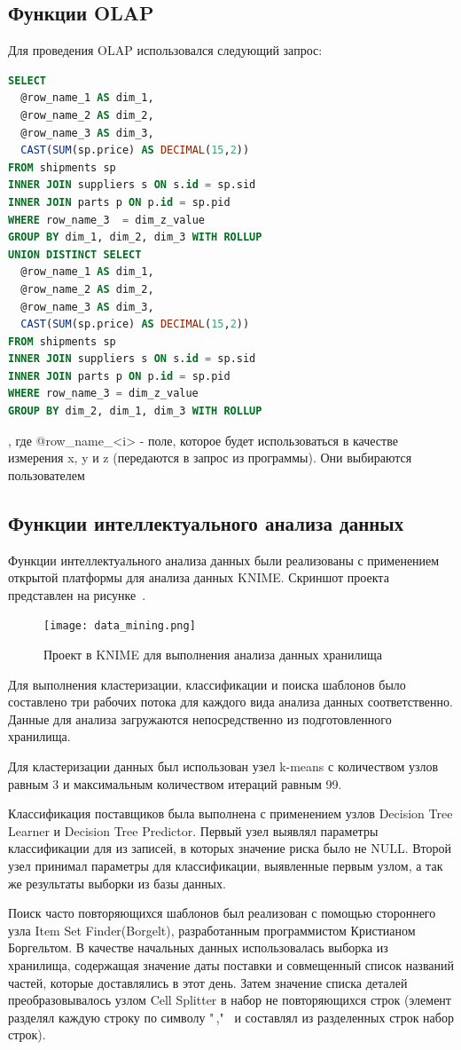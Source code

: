\subsection{Функции OLAP}
Для проведения OLAP использовался следующий запрос:
\begin{lstlisting}[language=SQL]
SELECT 
  @row_name_1 AS dim_1, 
  @row_name_2 AS dim_2, 
  @row_name_3 AS dim_3, 
  CAST(SUM(sp.price) AS DECIMAL(15,2)) 
FROM shipments sp 
INNER JOIN suppliers s ON s.id = sp.sid 
INNER JOIN parts p ON p.id = sp.pid 
WHERE row_name_3  = dim_z_value 
GROUP BY dim_1, dim_2, dim_3 WITH ROLLUP 
UNION DISTINCT SELECT 
  @row_name_1 AS dim_1, 
  @row_name_2 AS dim_2, 
  @row_name_3 AS dim_3, 
  CAST(SUM(sp.price) AS DECIMAL(15,2)) 
FROM shipments sp 
INNER JOIN suppliers s ON s.id = sp.sid 
INNER JOIN parts p ON p.id = sp.pid 
WHERE row_name_3 = dim_z_value  
GROUP BY dim_2, dim_1, dim_3 WITH ROLLUP
\end{lstlisting},
где @row\_name\_<i> - поле, которое будет использоваться в качестве измерения x, y и z (передаются в запрос из программы). Они выбираются пользователем 

\subsection{Функции интеллектуального анализа данных}
Функции интеллектуального анализа данных были реализованы с применением открытой платформы для анализа данных KNIME. Скриншот проекта представлен на рисунке~.\par
\begin{figure}[h]
  \centering
  \texttt{[image: data\_mining.png]}
  \caption{Проект в KNIME для выполнения анализа данных хранилища}
  \label{data-mining}
\end{figure}
Для выполнения кластеризации, классификации и поиска шаблонов было составлено три рабочих потока для каждого вида анализа данных соответственно. Данные для анализа загружаются непосредственно из подготовленного хранилища. \par
Для кластеризации данных был использован узел k-means с количеством узлов равным 3 и максимальным количеством итераций равным 99. \par
Классификация поставщиков была выполнена с применением узлов Decision Tree Learner и Decision Tree Predictor. Первый узел выявлял параметры классификации для из записей, в которых значение риска было не NULL. Второй узел принимал параметры для классификации, выявленные первым узлом, а так же результаты выборки из базы данных. \par
Поиск часто повторяющихся шаблонов был реализован с помощью стороннего узла Item Set Finder(Borgelt), разработанным программистом Кристианом Боргельтом. В качестве начальных данных использовалась выборка из хранилища, содержащая значение даты поставки и совмещенный список названий частей, которые доставлялись в этот день. Затем значение списка деталей преобразовывалось узлом Cell Splitter в набор не повторяющихся строк (элемент разделял каждую строку по символу "\,," \ и составлял из разделенных строк набор строк).

